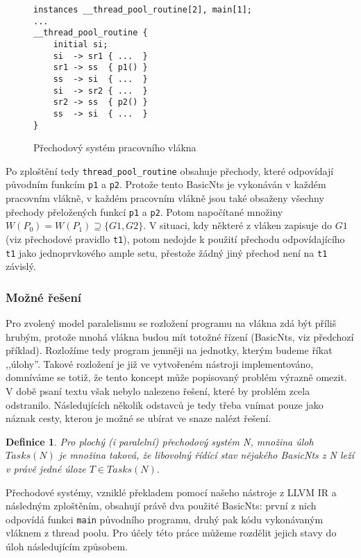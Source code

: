 \documentclass[12pt]{fithesis2}
\newtheorem{definition}{Definice}
\begin{document}
\begin{figure}
\begin{lstlisting}
instances __thread_pool_routine[2], main[1];
...
__thread_pool_routine {
	initial	si;
	si  -> sr1 { ...  }
	sr1 -> ss  { p1() }
	ss  -> si  { ...  }
	si  -> sr2 { ...  }
	sr2 -> ss  { p2() }
	ss  -> si  { ...  }
}
\end{lstlisting}
\caption{Přechodový systém pracovního vlákna}
\end{figure}

Po zploštění tedy \texttt{thread\_pool\_routine} obsahuje přechody, které odpovídají původním funkcím \texttt{p1} a \texttt{p2}. Protože tento BasicNts je vykonáván v každém pracovním vlákně, v každém pracovním vlákně jsou také obsaženy všechny přechody přeložených funkcí \texttt{p1} a \texttt{p2}. Potom napočítané množiny $W(P_0) = W(P_1) \supseteq \{ G1, G2\}$. V situaci, kdy některé z vláken zapisuje do $G1$ (viz přechodové pravidlo \texttt{t1}), potom nedojde k použití přechodu odpovídajícího \texttt{t1} jako jednoprvkového ample setu, přestože žádný jiný přechod není na \texttt{t1} závislý. 

\subsubsection{Možné řešení}
Pro zvolený model paralelismu se rozložení programu na vlákna zdá být příliš hrubým, protože mnohá vlákna budou mít totožné řízení (BasicNts, viz předchozí příklad). Rozložíme tedy program jemněji na jednotky, kterým budeme říkat ,,úlohy''. Takové rozložení je již ve vytvořeném nástroji implementováno, domníváme se totiž, že tento koncept může popisovaný problém výrazně omezit. V době psaní textu však nebylo nalezeno řešení, které by problém zcela odstranilo. Následujících několik odstavců je tedy třeba vnímat pouze jako náznak cesty, kterou je možné se ubírat ve snaze nalézt řešení.

\begin{definition}
Pro plochý (i paralelní) přechodový systém N, množina úloh $\mathit{Tasks}(N)$ je množina taková, že libovolný řídící stav nějakého BasicNts z N leží v právě jedné úloze $T \in \mathit{Tasks}(N)$.
\end{definition}

Přechodové systémy, vzniklé překladem pomocí našeho nástroje z LLVM IR a následným zploštěním, obsahují právě dva použité BasicNts: první z nich odpovídá funkci \texttt{main} původního programu, druhý pak kódu vykonávaným vláknem z thread poolu. Pro účely této práce můžeme rozdělit jejich stavy do úloh následujícím způsobem.
\end{document}
